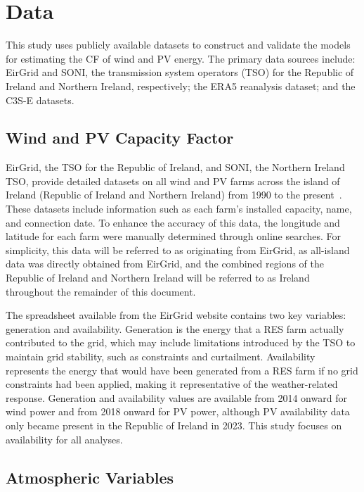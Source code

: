 \documentclass[preprint, 12pt, authoryear]{elsarticle}
\begin{document}
\section{Data}
\label{sec:Data}

This study uses publicly available datasets to construct and validate the models for estimating the CF of wind and PV energy. The primary data sources include: EirGrid and SONI, the transmission system operators (TSO) for the Republic of Ireland and Northern Ireland, respectively; the ERA5 reanalysis dataset; and the C3S-E datasets.

\subsection{Wind and PV Capacity Factor}
\label{sec:eirgrid}

EirGrid, the TSO for the Republic of Ireland, and SONI, the Northern Ireland TSO, provide detailed datasets on all wind and PV farms across the island of Ireland (Republic of Ireland and Northern Ireland) from 1990 to the present~\citep{eirgrid2023spreadsheet}. These datasets include information such as each farm’s installed capacity, name, and connection date. To enhance the accuracy of this data, the longitude and latitude for each farm were manually determined through online searches. For simplicity, this data will be referred to as originating from EirGrid, as all-island data was directly obtained from EirGrid, and the combined regions of the Republic of Ireland and Northern Ireland will be referred to as Ireland throughout the remainder of this document.

The spreadsheet available from the EirGrid website contains two key variables: generation and availability. Generation is the energy that a RES farm actually contributed to the grid, which may include limitations introduced by the TSO to maintain grid stability, such as constraints and curtailment. Availability represents the energy that would have been generated from a RES farm if no grid constraints had been applied, making it representative of the weather-related response. Generation and availability values are available from 2014 onward for wind power and from 2018 onward for PV power, although PV availability data only became present in the Republic of Ireland in 2023. This study focuses on availability for all analyses.

\subsection{Atmospheric Variables}
\label{sec:era5}
\end{document}
